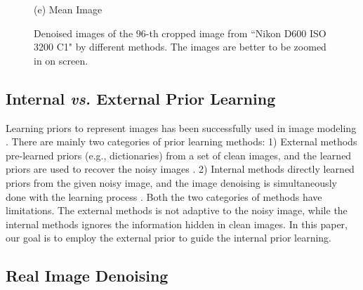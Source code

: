 \documentclass[10pt,twocolumn,letterpaper]{article}
\begin{document}
\begin{figure}
{\begin{minipage}[t]{0.195\textwidth}
{\footnotesize (e) Mean Image \cite{crosschannel2016}}
\end{minipage}
}
\caption{Denoised images of the $96$-th cropped image from ``Nikon D600 ISO 3200 C1" \cite{crosschannel2016} by different methods. The images are better to be zoomed in on screen.}
\vspace{-3mm}
\label{fig2}
\end{figure}




\subsection{Internal \textbf{\emph{vs.}} External Prior Learning}

Learning priors to represent images has been successfully used in image modeling \cite{ksvd,epll,pgpd,ple}. There are mainly two categories of prior learning methods: 1) External methods pre-learned priors (e.g., dictionaries) from a set of clean images, and the learned priors are used to recover the noisy images \cite{epll,pgpd}. 2) Internal methods directly learned priors from the given noisy image, and the image denoising is simultaneously done with the learning process \cite{ksvd,ple}. Both the two categories of methods have limitations. The external methods is not adaptive to the noisy image, while the internal methods ignores the information hidden in clean images. In this paper, our goal is to employ the external prior to guide the internal prior learning.

\subsection{Real Image Denoising}
\end{document}
